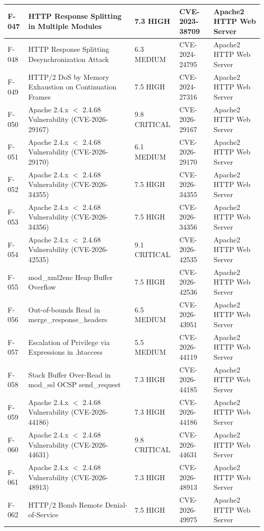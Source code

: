 \begin{longtable}{|l|p{5cm}|l|l|p{3cm}|}
F-047 & HTTP Response Splitting in Multiple Modules & 7.3 HIGH & CVE-2023-38709 & Apache2 HTTP Web Server\\ \hline
F-048 & HTTP Response Splitting Desynchronization Attack & 6.3 MEDIUM & CVE-2024-24795 & Apache2 HTTP Web Server\\ \hline
F-049 & HTTP/2 DoS by Memory Exhaustion on Continuation Frames & 7.5 HIGH & CVE-2024-27316 & Apache2 HTTP Web Server\\ \hline
F-050 & Apache 2.4.x $<$ 2.4.68 Vulnerability (CVE-2026-29167) & 9.8 CRITICAL & CVE-2026-29167 & Apache2 HTTP Web Server \\ \hline
F-051 & Apache 2.4.x $<$ 2.4.68 Vulnerability (CVE-2026-29170) & 6.1 MEDIUM & CVE-2026-29170& Apache2 HTTP Web Server \\ \hline
F-052 & Apache 2.4.x $<$ 2.4.68 Vulnerability (CVE-2026-34355) & 7.5 HIGH & CVE-2026-34355 & Apache2 HTTP Web Server\\ \hline
F-053 & Apache 2.4.x $<$ 2.4.68 Vulnerability (CVE-2026-34356) & 7.5 HIGH & CVE-2026-34356 & Apache2 HTTP Web Server\\ \hline
F-054 & Apache 2.4.x $<$ 2.4.68 Vulnerability (CVE-2026-42535) & 9.1 CRITICAL & CVE-2026-42535 & Apache2 HTTP Web Server\\ \hline
F-055 & mod\_xml2enc Heap Buffer Overflow & 7.5 HIGH & CVE-2026-42536 & Apache2 HTTP Web Server\\ \hline
F-056 & Out-of-bounds Read in merge\_response\_headers & 6.5 MEDIUM & CVE-2026-43951& Apache2 HTTP Web Server \\ \hline
F-057 & Escalation of Privilege via Expressions in .htaccess & 5.5 MEDIUM & CVE-2026-44119 & Apache2 HTTP Web Server\\ \hline
F-058 & Stack Buffer Over-Read in mod\_ssl OCSP send\_request & 7.3 HIGH & CVE-2026-44185 & Apache2 HTTP Web Server\\ \hline
F-059 & Apache 2.4.x $<$ 2.4.68 Vulnerability (CVE-2026-44186) & 7.3 HIGH & CVE-2026-44186 & Apache2 HTTP Web Server\\ \hline
F-060 & Apache 2.4.x $<$ 2.4.68 Vulnerability (CVE-2026-44631) & 9.8 CRITICAL & CVE-2026-44631& Apache2 HTTP Web Server \\ \hline
F-061 & Apache 2.4.x $<$ 2.4.68 Vulnerability (CVE-2026-48913) & 7.3 HIGH & CVE-2026-48913 & Apache2 HTTP Web Server\\ \hline
F-062 & HTTP/2 Bomb Remote Denial-of-Service & 7.5 HIGH & CVE-2026-49975 & Apache2 HTTP Web Server\\ \hline

\end{longtable}
